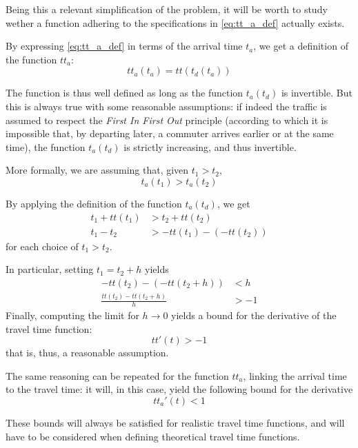 Being this a relevant simplification of the problem,
it will be worth to study wether a function adhering to the specifications in \eqref{eq:tt_a_def} actually exists.

By expressing \eqref{eq:tt_a_def} in terms of the arrival time \(t_a\),
we get a definition of the function \(tt_a\):
\begin{equation*}
  tt_a(t_a) = tt(t_d(t_a))
\end{equation*}

The function is thus well defined as long as the function \(t_a(t_d)\) is invertible.
But this is always true with some reasonable assumptions:
if indeed the traffic is assumed to respect the \textit{First In First Out} principle
(according to which it is impossible that, by departing later, a commuter arrives earlier or at the same time),
the function \(t_a(t_d)\) is strictly increasing, and thus invertible.

More formally, we are assuming that, given \(t_1 > t_2\),
\begin{equation*}
  t_a(t_1) > t_a(t_2)
\end{equation*}

By applying the definition of the function \(t_a(t_d)\), we get
\begin{align*}
  t_1 + tt(t_1) & > t_2 + tt(t_2) \\
  t_1 - t_2 & > - tt(t_1) - (-tt(t_2))
\end{align*}
for each choice of \(t_1 > t_2\).

In particular, setting \(t_1 = t_2 + h\) yields
\begin{align*}
  - tt(t_2) - (- tt(t_2 + h)) & < h\\
  \frac{tt(t_2) - tt(t_2 + h)}{h} & > -1
\end{align*}
Finally, computing the limit for \(h \rightarrow 0\) yields a bound for the derivative of the travel time function:
\begin{equation}
  \label{eq:bound_der_tt}
  tt'(t) > -1
\end{equation}
that is, thus, a reasonable assumption.

The same reasoning can be repeated for the function \(tt_a\),
linking the arrival time to the travel time:
it will, in this case, yield the following bound for the derivative
\begin{equation}
  \label{eq:bound_der_tt_a}
  tt_a'(t) < 1
\end{equation}

These bounds will always be satisfied for realistic travel time functions,
and will have to be considered when defining theoretical travel time functions.

